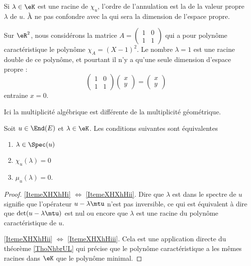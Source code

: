 Si \( \lambda\in\eK\) est une racine de \( \chi_u\), l'ordre de l'annulation est la  de la valeur propre \( \lambda\) de \( u\). À ne pas confondre avec la  qui sera la dimension de l'espace propre.

\begin{example} \label{ExICOJcFp}
    Sur \( \eR^2\), nous considérons la matrice \( A=\begin{pmatrix}
        1    &   0    \\ 
        1    &   1    
    \end{pmatrix}\) qui a pour polynôme caractéristique le polynôme \( \chi_A=(X-1)^2\). Le nombre \( \lambda=1\) est une racine double de ce polynôme, et pourtant il n'y a qu'une seule dimension d'espace propre :
    \begin{equation}
        \begin{pmatrix}
            1    &   0    \\ 
            1    &   1    
        \end{pmatrix}\begin{pmatrix}
            x    \\ 
            y    
        \end{pmatrix}=\begin{pmatrix}
            x    \\ 
            y    
        \end{pmatrix}
    \end{equation}
    entraine \( x=0\).

    Ici la multiplicité algébrique est différente de la multiplicité géométrique.
\end{example}

\begin{theorem} \label{ThoWDGooQUGSTL}
    Soit \( u\in\End(E)\) et \( \lambda\in\eK\). Les conditions suivantes sont équivalentes
    \begin{enumerate}
        \item\label{ItemeXHXhHi}
            \( \lambda\in\Spec(u)\)
        \item\label{ItemeXHXhHii}
            \( \chi_u(\lambda)=0\)
        \item\label{ItemeXHXhHiii}
            \( \mu_u(\lambda)=0\).
    \end{enumerate}
\end{theorem}

\begin{proof}
    \ref{ItemeXHXhHi} \( \Leftrightarrow\) \ref{ItemeXHXhHii}. Dire que \( \lambda\) est dans le spectre de \( u\) signifie que l'opérateur \( u-\lambda\mtu\) n'est pas inversible, ce qui est équivalent à dire que \( \det(u-\lambda\mtu)\) est nul ou encore que \( \lambda\) est une racine du polynôme caractéristique de \( u\). 

    \ref{ItemeXHXhHii} \( \Leftrightarrow\) \ref{ItemeXHXhHiii}. Cela est une application directe du théorème \ref{ThoNhbrUL} qui précise que le polynôme caractéristique a les mêmes racines dans \(\eK\) que le polynôme minimal.
\end{proof}

